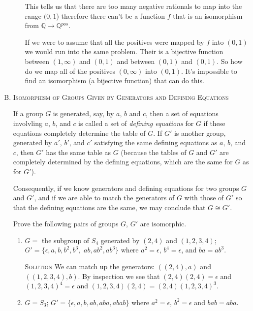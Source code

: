 \documentclass[twoside]{amsart}
\newcommand{\Rationals}{\mathbb{Q}{}}
\newcommand{\solution}{\textsc{Solution}\xspace}
\newcommand{\iso}{\cong}
\newcommand{\blank}{\vspace{5pt}}
\begin{document}
\begin{enumerate}[A.]
\begin{enumerate}[1]
      This tells us that there are too many negative rationals to map into
      the range $(0,1$) therefore there can't be a function $f$ that
      is an isomorphism from $\Rationals \to \Rationals^{pos}$.

      If we were to assume that all the positives were mapped
      by $f$ into $(0,1)$ we would run into the same problem. Their
      is a bijective function between $(1,\infty)$ and $(0,1)$ and
      between $(0,1)$ and $(0,1)$. So how do we map all of the positives
      $(0,\infty)$ into $(0,1)$. It's impossible to find an isomorphism (a
      bijective function) that can do this.

   \end{enumerate}

   \item \textsc{Isomorphism of Groups Given by Generators and 
   Defining Equations}

   If a group $G$ is generated, say, by $a$, $b$ and $c$, then a set of
   equations involvling $a$, $b$, and $c$ is called a set of
   \emph{defining equations} for $G$ if these equations completely
   determine the table of $G$. If $G'$ is another group, generated by
   $a'$, $b'$, and $c'$ satisfying the same defining equations as
   $a$, $b$, and $c$, then  $G'$ has the same table as $G$ (because the
   tables of $G$ and $G'$ are completely determined by the defining equations,
   which are the same for $G$ as for $G'$).

   Consequently, if we know generators and defining equations for two groups
   $G$ and $G'$, and if we are able to match the generators of $G$ with
   those of $G'$ so that the defining equations are the same, we may
   conclude that $G \iso G'$.

   Prove the following pairs of groups $G$, $G'$ are isomorphic.

   \begin{enumerate}[1]
      \item $G =$ the subgroup of $S_4$ generated by $(2,4)$ and
      $(1,2,3,4)$; $G' = \{ \epsilon, a, b, b^2, b^3, $
      $ab, ab^2, ab^3\}$
      where $a^2 = \epsilon$, $b^4 = \epsilon$, and $ba = ab^3$.

      \blank \noindent \solution We can match up the generators:
      $((2,4), a)$ and $((1,2,3,4), b)$. By inspection we
      see that $(2,4)(2,4) = \epsilon$ and $(1,2,3,4)^4 = \epsilon$
      and $(1,2,3,4)(2,4) = (2,4)(1,2,3,4)^3$.

      \blank
      \item $G = S_3$; $G' = \{\epsilon, a, b, ab, aba, abab\}$ where
      $a^2 = \epsilon$, $b^2 = \epsilon$ and $bab = aba$.


\end{enumerate}
\end{enumerate}
\end{document}
